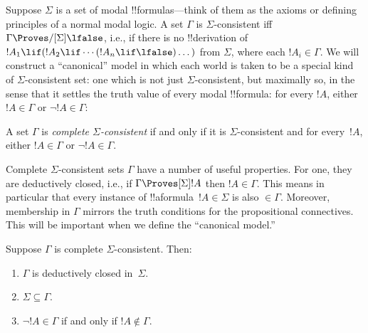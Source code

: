 \documentclass[../../../include/open-logic-section]{subfiles}
\begin{document}


Suppose $\Sigma$ is a set of modal !!{formula}s---think of them as the
axioms or defining principles of a normal modal logic. A set $\Gamma$
is $\Sigma$-consistent iff $\Gamma \Proves/[\Sigma] \lfalse$, i.e., if
there is no !!{derivation} of~$!A_1 \lif (!A_2 \lif \cdots (!A_n \lif
\lfalse)\dots)$ from $\Sigma$, where each $!A_i \in \Gamma$. We will
construct a ``canonical'' model in which each world is taken to be a
special kind of $\Sigma$-consistent set: one which is not just
$\Sigma$-consistent, but maximally so, in the sense that it settles
the truth value of every modal !!{formula}: for every $!A$, either $!A
\in \Gamma$ or $\lnot !A \in \Gamma$:

\begin{defn}
  A set $\Gamma$ is \emph{complete $\Sigma$-consistent} if and
  only if it is $\Sigma$-consistent and for every~$!A$, either
  $!A \in \Gamma$ or $\lnot !A \in \Gamma$.
\end{defn}

Complete $\Sigma$-consistent sets $\Gamma$ have a number of useful
properties. For one, they are deductively closed, i.e., if $\Gamma
\Proves[\Sigma] !A$ then $!A \in \Gamma$. This means in particular
that every instance of !!a{formula}~$!A \in \Sigma$ is also $\in
\Gamma$. Moreover, membership in $\Gamma$ mirrors the truth conditions
for the propositional connectives. This will be important when we
define the ``canonical model.''

\begin{prop}
  Suppose $\Gamma$ is complete $\Sigma$-consistent. Then:
  \begin{enumerate}
  \item {}%
    $\Gamma$ is deductively closed in~$\Sigma$.
  \item {}%
    $\Sigma \subseteq \Gamma$.
  \item {}%
    $\lnot!A \in \Gamma$ if and only if $!A \notin
    \Gamma$.
  \end{enumerate}
\end{prop}
\end{document}
